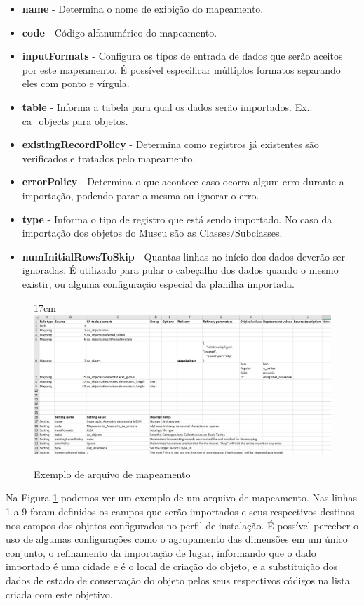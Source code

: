 \documentclass[a4paper,12pt,oneside,onecolumn,final,fleqn]{repUERJ}
\begin{document}
\begin{itemize}
	\item \textbf{name} - Determina o nome de exibição do mapeamento.
	\item \textbf{code} - Código alfanumérico do mapeamento.
	\item \textbf{inputFormats} - Configura os tipos de entrada de dados que serão aceitos por este mapeamento. É possível especificar múltiplos formatos separando eles com ponto e vírgula.
	\item \textbf{table} - Informa a tabela para qual os dados serão importados. Ex.: ca\_objects para objetos.
	\item \textbf{existingRecordPolicy} - Determina como registros já existentes são verificados e tratados pelo mapeamento.
	\item \textbf{errorPolicy} - Determina o que acontece caso ocorra algum erro durante a importação, podendo parar a mesma ou ignorar o erro.
	\item \textbf{type} - Informa o tipo de registro que está sendo importado. No caso da importação dos objetos do Museu são as Classes/Subclasses.
	\item \textbf{numInitialRowsToSkip} - Quantas linhas no início dos dados deverão ser ignoradas. É utilizado para pular o cabeçalho dos dados quando o mesmo existir, ou alguma configuração especial da planilha importada.
\end{itemize}

\begin{figure}[!ht]{17cm}
	\includegraphics[width=15cm, left]{figuras/ex_map.jpg}
	\caption{Exemplo de arquivo de mapeamento} \label{fig:map}
\end{figure}

Na Figura \ref{fig:map} podemos ver um exemplo de um arquivo de mapeamento. Nas linhas 1 a 9 foram definidos os campos que serão importados e seus respectivos destinos nos campos dos objetos configurados no perfil de instalação. É possível perceber o uso de algumas configurações como o agrupamento das dimensões em um único conjunto, o refinamento da importação de lugar, informando que o dado importado é uma cidade e é o local de criação do objeto, e a substituição dos dados de estado de conservação do objeto pelos seus respectivos códigos na lista criada com este objetivo.
\end{document}
